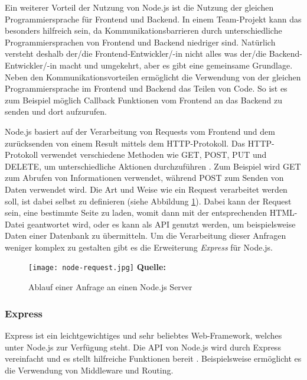 Ein weiterer Vorteil der Nutzung von Node.js ist die Nutzung der gleichen Programmiersprache für Frontend und Backend.
In einem Team-Projekt kann das besonders hilfreich sein, da Kommunikationsbarrieren durch unterschiedliche Programmiersprachen von Frontend und Backend niedriger sind. Natürlich versteht deshalb der/die Frontend-Entwickler/-in nicht alles was der/die Backend-Entwickler/-in macht und umgekehrt, aber es gibt eine gemeinsame Grundlage. Neben den Kommunikationsvorteilen ermöglicht die Verwendung von der gleichen Programmiersprache im Frontend und Backend das Teilen von Code. So ist es zum Beispiel möglich Callback Funktionen vom Frontend an das Backend zu senden und dort aufzurufen.

Node.js basiert auf der Verarbeitung von Requests vom Frontend und dem zurücksenden von einem Result mittels dem HTTP-Protokoll. Das HTTP-Protokoll verwendet verschiedene Methoden wie GET, POST, PUT und DELETE, um unterschiedliche Aktionen durchzuführen  \cite{expressbook}. Zum Beispiel wird GET zum Abrufen von Informationen verwendet, während POST zum Senden von Daten verwendet wird. Die Art und Weise wie ein Request verarbeitet werden soll, ist dabei selbst zu definieren (siehe Abbildung \ref{fig:node-request}). Dabei kann der Request sein, eine bestimmte Seite zu laden, womit dann mit der entsprechenden HTML-Datei geantwortet wird, oder es kann als API genutzt werden, um beispielsweise Daten einer Datenbank zu übermitteln. Um die Verarbeitung dieser Anfragen weniger komplex zu gestalten gibt es die Erweiterung \textit{Express} für Node.js.

  

  \begin{figure}[ht]
  \centering
  \texttt{[image: node-request.jpg]}
\raggedleft
    \footnotesize\sffamily\textbf{Quelle:} \cite{expressbook}
  \caption{Ablauf einer Anfrage an einen Node.js Server}
  \label{fig:node-request}
\end{figure}


\subsubsection{Express}
\label{sec:express}
Express ist ein leichtgewichtiges und sehr beliebtes Web-Framework, welches unter Node.js zur Verfügung steht. Die API von Node.js wird durch Express vereinfacht und es stellt hilfreiche Funktionen bereit \cite{expressbook}. Beispielsweise ermöglicht es die Verwendung von Middleware und Routing.

